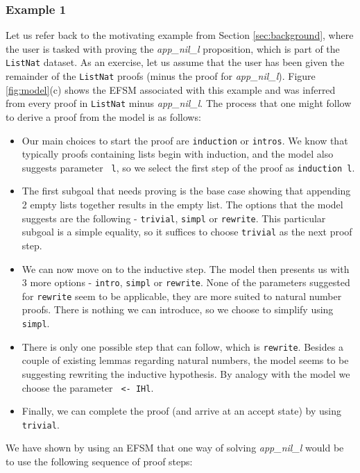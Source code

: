 \documentclass{llncs}
\begin{document}
\subsubsection{Example 1}
Let us refer back to the motivating example from Section \ref{sec:background}, where the user is tasked with proving the \emph{app\_nil\_l} proposition, which is part of the \texttt{ListNat} dataset. As an exercise, let us assume that the user has been given the remainder of the \texttt{ListNat} proofs (minus the proof for \emph{app\_nil\_l}). Figure \ref{fig:model}(c) shows the EFSM associated with this example and was inferred from every proof in \texttt{ListNat} minus \emph{app\_nil\_l}. The process that one might follow to derive a proof from the model is as follows: 
\begin{itemize}
\item{Our main choices to start the proof are \texttt{induction} or \texttt{intros}. We know that typically proofs containing lists begin with induction, and the model also suggests parameter \texttt{ l}, so we select the first step of the proof as \texttt{induction l}.}
\item{The first subgoal that needs proving is the base case showing that appending 2 empty lists together results in the empty list. The options that the model suggests are the following - \texttt{trivial}, \texttt{simpl} or \texttt{rewrite}. This particular subgoal is a simple equality, so it suffices to choose \texttt{trivial} as the next proof step.}
\item{We can now move on to the inductive step. The model then presents us with 3 more options - \texttt{intro}, \texttt{simpl} or \texttt{rewrite}. None of the parameters suggested for \texttt{rewrite} seem to be applicable, they are more suited to natural number proofs. There is nothing we can introduce, so we choose to simplify using \texttt{simpl}.}
\item{There is only one possible step that can follow, which is \texttt{rewrite}. Besides a couple of existing lemmas regarding natural numbers, the model seems to be suggesting rewriting the inductive hypothesis. By analogy with the model we choose the parameter \texttt{ <- IHl}.}
\item{Finally, we can complete the proof (and arrive at an accept state) by using \texttt{trivial}.}
\end{itemize}

We have shown by using an EFSM that one way of solving \emph{app\_nil\_l} would be to use the following sequence of proof steps: 
\end{document}
